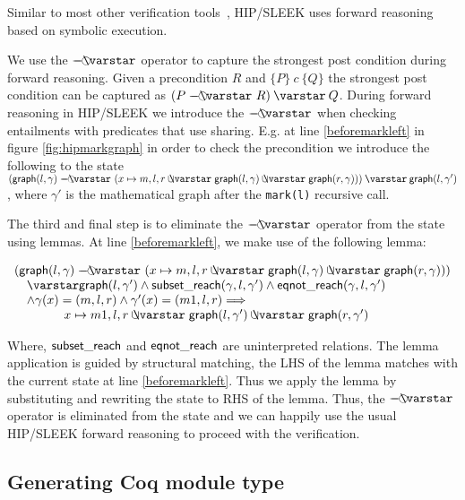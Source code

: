 Similar to most other verification tools~\cite{Beckert:2007,DistefanoP08,berdine:smallfoot,jacobs:verifast}, HIP/SLEEK uses forward reasoning based on symbolic execution.

We use the $\septraction$ operator to capture the strongest post condition during forward reasoning. Given a precondition $R$ and $\{P\}~c~\{Q\}$ the strongest post condition can be captured as $(P \septraction R) \scon Q$. During forward reasoning in HIP/SLEEK we introduce the $\septraction$ when checking entailments with predicates that use sharing. E.g. at line \ref{beforemarkleft} in figure \ref{fig:hipmarkgraph} in order to check the precondition we introduce the following to the state $ (\p{graph}(l, \gamma) \septraction (x \mapsto m,l,r \ocon \p{graph}(l, \gamma) \ocon \p{graph}(r, \gamma))) \scon \p{graph}(l, \gamma')$, where $\gamma'$ is the mathematical graph after the \texttt{mark(l)} recursive call.

The third and final step is to eliminate the $\septraction$ operator from the state using lemmas. At line \ref{beforemarkleft}, we make use of the following lemma:

\[
\begin{array}{l}
(\p{graph}(l, \gamma) \septraction (x \mapsto m,l,r \ocon \p{graph}(l, \gamma) \ocon \p{graph}(r, \gamma))) \\
\quad \scon \p{graph}(l, \gamma') \wedge \p{subset\_reach}(\gamma,l,\gamma') \wedge \p{eqnot\_reach}(\gamma,l,\gamma') \\
\quad \wedge  \gamma(x)=(m,l,r) \wedge \gamma'(x)=(m1,l,r) ==> \\
\qquad \qquad x \mapsto m1,l,r \ocon \p{graph}(l, \gamma') \ocon \p{graph}(r, \gamma')
\end{array}
\]

Where, $\mathsf{subset\_reach}$ and $\mathsf{eqnot\_reach}$ are uninterpreted relations. The lemma application is guided by structural matching, the LHS of the lemma matches with the current state at line \ref{beforemarkleft}. Thus we apply the lemma by substituting and rewriting the state to RHS of the lemma. Thus, the $\septraction$ operator is eliminated from the state and we can happily use the usual HIP/SLEEK forward reasoning to proceed with the verification.

\subsection{Generating Coq module type}


